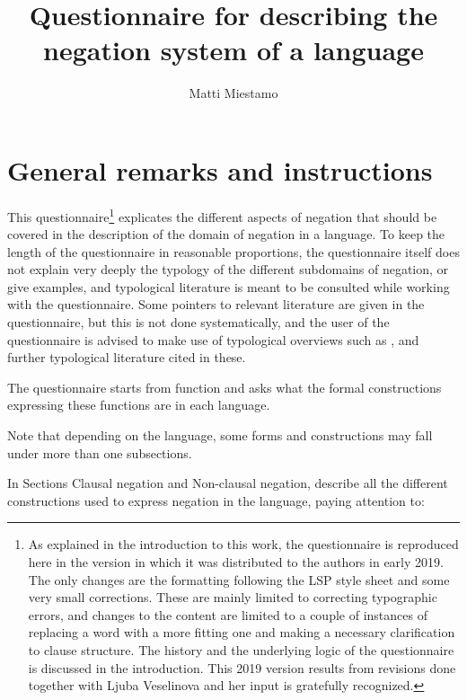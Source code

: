 \documentclass[output=paper,colorlinks,citecolor=brown]{langscibook}
\author{Matti Miestamo\affiliation{University of Helsinki}}
\title{Questionnaire for describing the negation system of a language}
\begin{document}
\maketitle 
\label{chapter:questionnaire}
\section*{General remarks and instructions}
This questionnaire\footnote{As explained in the introduction to this work, the questionnaire is reproduced here in the version in which it was distributed to the authors in early 2019. The only changes are the formatting following the LSP style sheet and some very small corrections. These are mainly limited to correcting typographic errors, and changes to the content are limited to a couple of instances of replacing a word with a more fitting one and making a necessary clarification to clause structure. The history and the underlying logic of the questionnaire is discussed in the introduction. This 2019 version results from revisions done together with Ljuba Veselinova and her input is gratefully recognized.} explicates the different aspects of negation that should be covered in the description of the domain of negation in a language. To keep the length of the questionnaire in reasonable proportions, the questionnaire itself does not explain very deeply the typology of the different subdomains of negation, or give examples, and typological literature is meant to be consulted while working with the questionnaire. Some pointers to relevant literature are given in the questionnaire, but this is not done systematically, and the user of the questionnaire is advised to make use of typological overviews such as \citealt{Miestamo2007,Miestamo2017}, and further typological literature cited in these.

The questionnaire starts from function and asks what the formal constructions expressing these functions are in each language. %

Note that depending on the language, some forms and constructions may fall under more than one subsections. 

In Sections  Clausal negation and  Non-clausal negation, describe all the different constructions used to express negation in the language, paying attention to:
\end{document}
